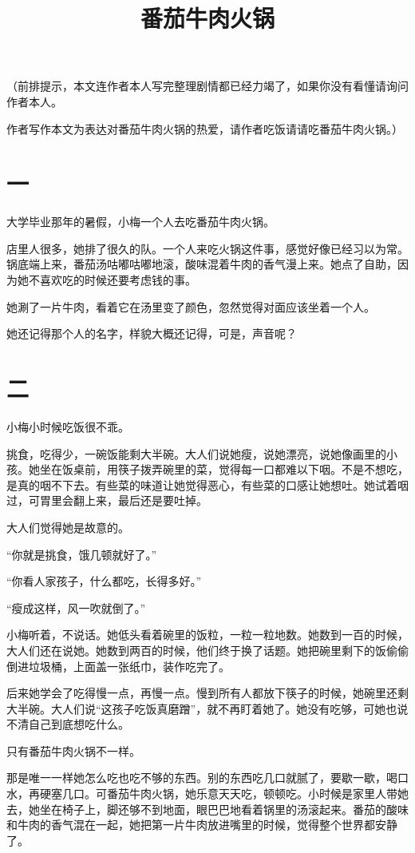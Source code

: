 \documentclass[12pt,a4paper]{ctexart}
\title{\textbf{番茄牛肉火锅}}
\author{}
\date{}
\begin{document}
\maketitle
（前排提示，本文连作者本人写完整理剧情都已经力竭了，如果你没有看懂请询问作者本人。

作者写作本文为表达对番茄牛肉火锅的热爱，请作者吃饭请请吃番茄牛肉火锅。）
\section*{一}

大学毕业那年的暑假，小梅一个人去吃番茄牛肉火锅。

店里人很多，她排了很久的队。一个人来吃火锅这件事，感觉好像已经习以为常。锅底端上来，番茄汤咕嘟咕嘟地滚，酸味混着牛肉的香气漫上来。她点了自助，因为她不喜欢吃的时候还要考虑钱的事。

她涮了一片牛肉，看着它在汤里变了颜色，忽然觉得对面应该坐着一个人。

她还记得那个人的名字，样貌大概还记得，可是，声音呢？

\section{二}

小梅小时候吃饭很不乖。

挑食，吃得少，一碗饭能剩大半碗。大人们说她瘦，说她漂亮，说她像画里的小孩。她坐在饭桌前，用筷子拨弄碗里的菜，觉得每一口都难以下咽。不是不想吃，是真的咽不下去。有些菜的味道让她觉得恶心，有些菜的口感让她想吐。她试着咽过，可胃里会翻上来，最后还是要吐掉。

大人们觉得她是故意的。

“你就是挑食，饿几顿就好了。”

“你看人家孩子，什么都吃，长得多好。”

“瘦成这样，风一吹就倒了。”

小梅听着，不说话。她低头看着碗里的饭粒，一粒一粒地数。她数到一百的时候，大人们还在说她。她数到两百的时候，他们终于换了话题。她把碗里剩下的饭偷偷倒进垃圾桶，上面盖一张纸巾，装作吃完了。

后来她学会了吃得慢一点，再慢一点。慢到所有人都放下筷子的时候，她碗里还剩大半碗。大人们说“这孩子吃饭真磨蹭”，就不再盯着她了。她没有吃够，可她也说不清自己到底想吃什么。

只有番茄牛肉火锅不一样。

那是唯一一样她怎么吃也吃不够的东西。别的东西吃几口就腻了，要歇一歇，喝口水，再硬塞几口。可番茄牛肉火锅，她乐意天天吃，顿顿吃。小时候是家里人带她去，她坐在椅子上，脚还够不到地面，眼巴巴地看着锅里的汤滚起来。番茄的酸味和牛肉的香气混在一起，她把第一片牛肉放进嘴里的时候，觉得整个世界都安静了。
\end{document}
